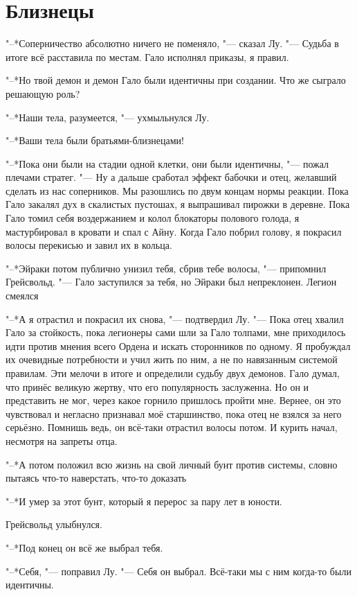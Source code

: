 \section{Близнецы}

"--*Соперничество абсолютно ничего не поменяло, "--- сказал Лу.
"--- Судьба в итоге всё расставила по местам.
Гало исполнял приказы, я правил.

"--*Но твой демон и демон Гало были идентичны при создании.
Что же сыграло решающую роль?

"--*Наши тела, разумеется, "--- ухмыльнулся Лу.

"--*Ваши тела были братьями-близнецами!

"--*Пока они были на стадии одной клетки, они были идентичны, "--- пожал плечами стратег.
"--- Ну а дальше сработал эффект бабочки и отец, желавший сделать из нас соперников.
Мы разошлись по двум концам нормы реакции.
Пока Гало закалял дух в скалистых пустошах, я выпрашивал пирожки в деревне.
Пока Гало томил себя воздержанием и колол блокаторы полового голода, я мастурбировал в кровати и спал с Айну.
Когда Гало побрил голову, я покрасил волосы перекисью и завил их в кольца.

"--*Эйраки потом публично унизил тебя, сбрив тебе волосы, "--- припомнил Грейсвольд.
"--- Гало заступился за тебя, но Эйраки был непреклонен.
Легион смеялся\ldotst

"--*А я отрастил и покрасил их снова, "--- подтвердил Лу.
"--- Пока отец хвалил Гало за стойкость, пока легионеры сами шли за Гало толпами, мне приходилось идти против мнения всего Ордена и искать сторонников по одному.
Я пробуждал их очевидные потребности и учил жить по ним, а не по навязанным системой правилам.
Эти мелочи в итоге и определили судьбу двух демонов.
Гало думал, что принёс великую жертву, что его популярность заслуженна.
Но он и представить не мог, через какое горнило пришлось пройти мне.
Вернее, он это чувствовал и негласно признавал моё старшинство, пока отец не взялся за него серьёзно.
Помнишь ведь, он всё-таки отрастил волосы потом.
И курить начал, несмотря на запреты отца.

"--*А потом положил всю жизнь на свой личный бунт против системы, словно пытаясь что-то наверстать, что-то доказать\ldotst

"--*И умер за этот бунт, который я перерос за пару лет в юности.

Грейсвольд улыбнулся.

"--*Под конец он всё же выбрал тебя.

"--*Себя, "--- поправил Лу.
"--- Себя он выбрал.
Всё-таки мы с ним когда-то были идентичны.

